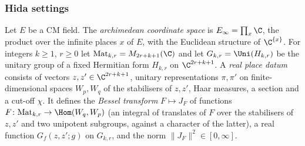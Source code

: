 \subsubsection{Hida settings}
\begin{definition}\label{pf:thmS-carrier:realplace}
Let $E$ be a CM field. The \emph{archimedean coordinate space} is $E_\infty=\prod_x\C$, the product over the infinite
places $x$ of $E$, with the Euclidean structure of $\C^{\{x\}}$. For integers $k\ge1$, $r\ge0$ let
$\mathrm{Mat}_{k,r}=M_{2r+k+1}(\C)$ and let $G_{k,r}=\Uni(H_{k,r})$ be the unitary group of a fixed Hermitian form
$H_{k,r}$ on $\C^{2r+k+1}$. A \emph{real place datum} consists of vectors $z,z'\in\C^{2r+k+1}$, unitary representations
$\pi,\pi'$ on finite-dimensional spaces $W_p,W_q$ of the stabilisers of $z,z'$, Haar measures, a section and a cut-off
$\chi$. It defines the \emph{Bessel transform} $F\mapsto J_F$ of functions $F\colon\mathrm{Mat}_{k,r}\to\Hom(W_q,W_p)$
(an integral of translates of $F$ over the stabilisers of $z,z'$ and two unipotent subgroups, against a character of the
latter), a real function $G_f(z,z';g)$ on $G_{k,r}$, and the norm $\|J_F\|^2\in[0,\infty]$.
\end{definition}

